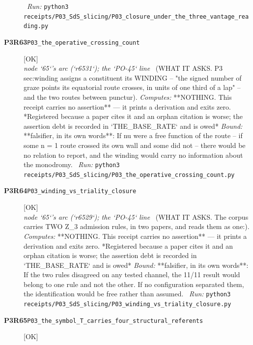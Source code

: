 \begin{description}
\ \emph{Run:} \texttt{python3 receipts/P03\_SdS\_slicing/P03\_closure\_under\_the\_three\_vantage\_reading.py}
\item[\rcptlabel{P03_the_operative_crossing_count}{P3R63}\textbf{P3R63}\quad\texttt{P03\_the\_operative\_crossing\_count}]\hfill\textsf{[OK]}\\
\textit{node `65`'s arc (`r6531`); the `PO-45` line} \ (WHAT IT ASKS. P3 sec:winding assigns a constituent its WINDING -- "the signed number of graze points its equatorial route crosses, in units of one third of a lap" -- and the two routes between punctur). 
\emph{Computes:}  **NOTHING. This receipt carries no assertion** --- it prints a derivation and exits zero. *Registered because a paper cites it and an orphan citation is worse; the assertion debt is recorded in `THE\_BASE\_RATE` and is owed*
 \emph{Bound:} **falsifier, in its own words**: If nu were a free function of the route -- if some n = 1 route crossed its own wall and some did not -- there would be no relation to report, and the winding would carry no information about the monodromy.
\ \emph{Run:} \texttt{python3 receipts/P03\_SdS\_slicing/P03\_the\_operative\_crossing\_count.py}
\item[\rcptlabel{P03_winding_vs_triality_closure}{P3R64}\textbf{P3R64}\quad\texttt{P03\_winding\_vs\_triality\_closure}]\hfill\textsf{[OK]}\\
\textit{node `65`'s arc (`r6529`); the `PO-45` line} \ (WHAT IT ASKS. The corpus carries TWO Z\_3 admission rules, in two papers, and reads them as one:). 
\emph{Computes:}  **NOTHING. This receipt carries no assertion** --- it prints a derivation and exits zero. *Registered because a paper cites it and an orphan citation is worse; the assertion debt is recorded in `THE\_BASE\_RATE` and is owed*
 \emph{Bound:} **falsifier, in its own words**: If the two rules disagreed on any tested channel, the 11/11 result would belong to one rule and not the other. If no configuration separated them, the identification would be free rather than assumed.
\ \emph{Run:} \texttt{python3 receipts/P03\_SdS\_slicing/P03\_winding\_vs\_triality\_closure.py}
\item[\rcptlabel{P03_the_symbol_T_carries_four_structural_referents}{P3R65}\textbf{P3R65}\quad\texttt{P03\_the\_symbol\_T\_carries\_four\_structural\_referents}]\hfill\textsf{[OK]}\\

\end{description}

